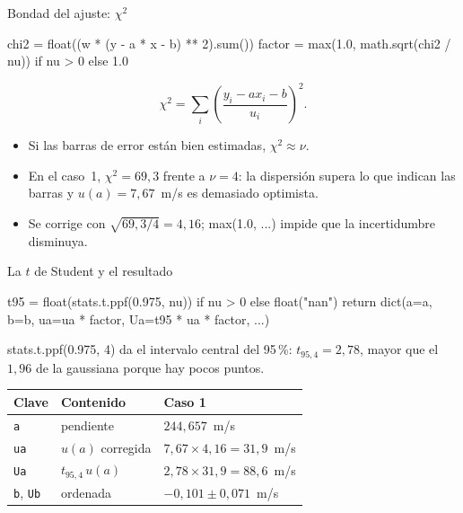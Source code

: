 \documentclass[10pt]{beamer}
\newcommand{\cod}[1]{{\setlength{\fboxsep}{1.4pt}\colorbox{codinline}{\textcolor{codrojo}{\ttfamily\small #1}}}}
\begin{document}
\begin{frame}[fragile]{Bondad del ajuste: $\chi^{2}$}
  \begin{codigo}[listing options={style=python, basicstyle=\ttfamily\scriptsize\color{codtexto}}]
chi2 = float((w * (y - a * x - b) ** 2).sum())
factor = max(1.0, math.sqrt(chi2 / nu)) if nu > 0 else 1.0
  \end{codigo}
  \begin{block}{}
    \begin{equation}
      \chi^{2}=\sum_i\left(\frac{y_i-ax_i-b}{u_i}\right)^{2}.
    \end{equation}
  \end{block}
  \small
  \begin{itemize}
    \item Si las barras de error están bien estimadas, $\chi^{2}\approx\nu$.
    \item En el caso~1, $\chi^{2}=69{,}3$ frente a $\nu=4$: la dispersión supera lo
      que indican las barras y $u(a)=7{,}67$~m/s es demasiado optimista.
    \item Se corrige con $\sqrt{69{,}3/4}=4{,}16$; \cod{max(1.0, ...)} impide que la
      incertidumbre disminuya.
  \end{itemize}
\end{frame}

\begin{frame}[fragile]{La $t$ de Student y el resultado}
  \begin{codigo}[listing options={style=python, basicstyle=\ttfamily\scriptsize\color{codtexto}}]
t95 = float(stats.t.ppf(0.975, nu)) if nu > 0 else float("nan")
return dict(a=a, b=b, ua=ua * factor, Ua=t95 * ua * factor, ...)
  \end{codigo}
  \cod{stats.t.ppf(0.975, 4)} da el intervalo central del 95\,\%:
  $t_{95,4}=2{,}78$, mayor que el $1{,}96$ de la gaussiana porque hay pocos puntos.
  \begin{center}\small
  \begin{tabular}{@{}lll@{}}
    \toprule
    Clave & Contenido & Caso 1\\
    \midrule
    \texttt{a} & pendiente & $244{,}657$~m/s\\
    \texttt{ua} & $u(a)$ corregida & $7{,}67\times4{,}16=31{,}9$~m/s\\
    \texttt{Ua} & $t_{95,4}\,u(a)$ & $2{,}78\times31{,}9=88{,}6$~m/s\\
    \texttt{b}, \texttt{Ub} & ordenada & $-0{,}101\pm0{,}071$~m/s\\
    \bottomrule
  \end{tabular}
  \end{center}
\end{frame}
\end{document}
